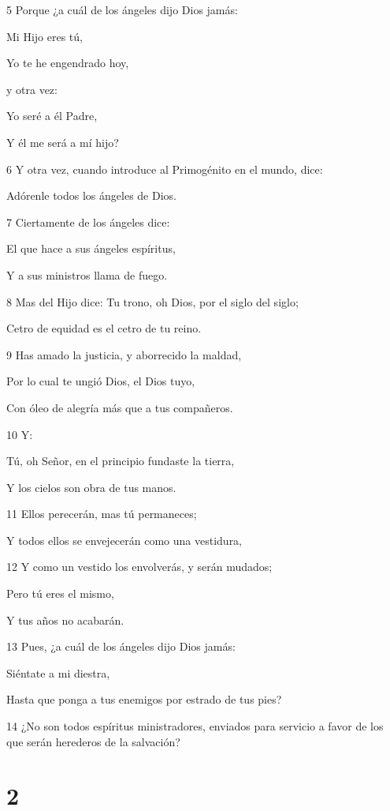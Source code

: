 \par 5 Porque ¿a cuál de los ángeles dijo Dios jamás:
\par Mi Hijo eres tú,
\par Yo te he engendrado hoy,
\par y otra vez:
\par Yo seré a él Padre,
\par Y él me será a mí hijo?
\par 6 Y otra vez, cuando introduce al Primogénito en el mundo, dice:
\par Adórenle todos los ángeles de Dios.
\par 7 Ciertamente de los ángeles dice:
\par El que hace a sus ángeles espíritus,
\par Y a sus ministros llama de fuego.
\par 8 Mas del Hijo dice: Tu trono, oh Dios, por el siglo del siglo;
\par Cetro de equidad es el cetro de tu reino.
\par 9 Has amado la justicia, y aborrecido la maldad,
\par Por lo cual te ungió Dios, el Dios tuyo,
\par Con óleo de alegría más que a tus compañeros.
\par 10 Y:
\par Tú, oh Señor, en el principio fundaste la tierra,
\par Y los cielos son obra de tus manos.
\par 11 Ellos perecerán, mas tú permaneces;
\par Y todos ellos se envejecerán como una vestidura,
\par 12 Y como un vestido los envolverás, y serán mudados;
\par Pero tú eres el mismo,
\par Y tus años no acabarán.
\par 13 Pues, ¿a cuál de los ángeles dijo Dios jamás:
\par Siéntate a mi diestra,
\par Hasta que ponga a tus enemigos por estrado de tus pies?
\par 14 ¿No son todos espíritus ministradores, enviados para servicio a favor de los que serán herederos de la salvación?

\chapter{2}

